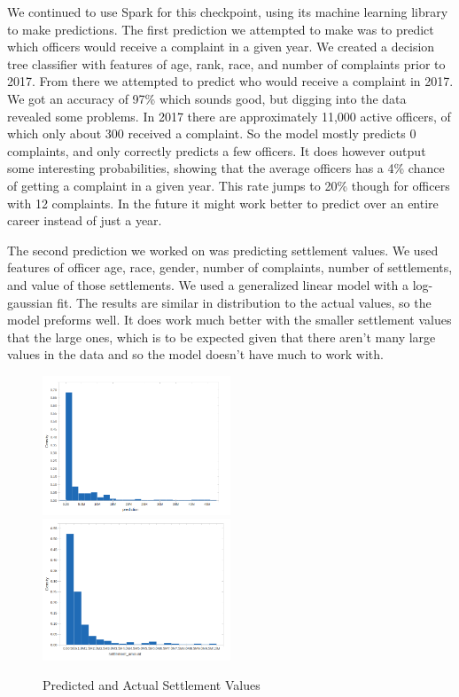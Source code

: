 \documentclass[11pt]{article}
\begin{document}
We continued to use Spark for this checkpoint, using its machine learning library to make predictions. The first prediction we attempted to make was to predict which officers would receive a complaint in a given year. We created a decision tree classifier with features of age, rank, race, and number of complaints prior to 2017. From there we attempted to predict who would receive a complaint in 2017. We got an accuracy of 97\% which sounds good, but digging into the data revealed some problems. In 2017 there are approximately 11,000 active officers, of which only about 300 received a complaint. So the model mostly predicts 0 complaints, and only correctly predicts a few officers. It does however output some interesting probabilities, showing that the average officers has a 4\% chance of getting a complaint in a given year. This rate jumps to 20\% though for officers with 12 complaints. In the future it might work better to predict over an entire career instead of just a year.


The second prediction we worked on was predicting settlement values. We used features of officer age, race, gender, number of complaints, number of settlements, and value of those settlements. We used a generalized linear model with a log-gaussian fit. The results are similar in distribution to the actual values, so the model preforms well. It does work much better with the smaller settlement values that the large ones, which is to be expected given that there aren't many large values in the data and so the model doesn't have much to work with.

\begin{figure}[h]
\caption{Predicted and Actual Settlement Values}
\includegraphics[width=0.5\textwidth]{predicted.png}
\includegraphics[width=0.5\textwidth]{actual2.png}
\end{figure}
\end{document}
